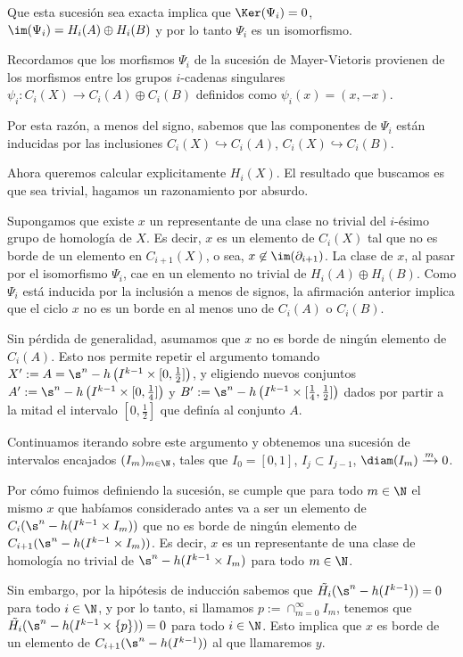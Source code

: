 \begin{dem}
    Que esta sucesión sea exacta implica que $\Ker(\Psi_i)=0$, $\im(\Psi_i) = H_i(A)\oplus H_i(B)$ y por lo tanto $\Psi_i$ es un isomorfismo.

    Recordamos que los morfismos $\Psi_i$ de la sucesión de Mayer-Vietoris provienen de los morfismos entre los grupos $i$-cadenas singulares $\psi_i :C_i(X)\rightarrow C_i(A)\oplus C_i(B)$ definidos como $\psi_i(x)=(x,-x)$. 
        
    Por esta razón, a menos del signo, sabemos que las componentes de $\Psi_i$ están inducidas por las inclusiones $C_i(X)\hookrightarrow C_i(A)$, $C_i(X)\hookrightarrow C_i(B)$.

    Ahora queremos calcular explicitamente $H_i(X)$. El resultado que buscamos es que sea trivial, hagamos un razonamiento por absurdo.

    Supongamos que existe $x$ un representante de una clase no trivial del $i$-ésimo grupo de homología de $X$. Es decir, $x$ es un elemento de $C_i(X)$ tal que no es borde de un elemento en $C_{i+1}(X)$, o sea, $x\not\in\im(\partial_{i+1})$. La clase de $x$, al pasar por el isomorfismo $\Psi_i$, cae en un elemento no trivial de $H_i(A)\oplus H_i(B)$. Como $\Psi_i$ está inducida por la inclusión a menos de signos, la afirmación anterior implica que el ciclo $x$ no es un borde en al menos uno de $C_i(A)$ o $C_i(B)$.

    Sin pérdida de generalidad, asumamos que $x$ no es borde de ningún elemento de $C_i(A)$. Esto nos permite repetir el argumento tomando $X':=A=\s^n - h\left(I^{k-1}\times[0,\frac{1}{2}]\right)$, y eligiendo nuevos conjuntos $A':=\s^n - h\left(I^{k-1}\times[0,\frac{1}{4}]\right)$ y $B':=\s^n - h\left(I^{k-1}\times[\frac{1}{4},\frac{1}{2}]\right)$ dados por partir a la mitad el intervalo $[0,\frac{1}{2}]$ que definía al conjunto $A$. 
    
    Continuamos iterando sobre este argumento y obtenemos una sucesión de intervalos encajados $(I_m)_{m\in\N}$, tales que $I_0=[0,1]$, $I_j\subset I_{j-1}$, $\diam(I_m)\xrightarrow{m}0$.

    Por cómo fuimos definiendo la sucesión, se cumple que para todo $m\in\N$ el mismo $x$ que habíamos considerado antes va a ser un elemento de $C_i(\s^n - h(I^{k-1}\times I_m))$ que no es borde de ningún elemento de $C_{i+1}(\s^n - h(I^{k-1}\times I_m))$. Es decir, $x$ es un representante de una clase de homología no trivial de $\s^n - h(I^{k-1}\times I_m)$ para todo $m\in\N$.

    Sin embargo, por la hipótesis de inducción sabemos que $\tilde{H_i}(\s^n - h(I^{k-1}))=0$ para todo $i\in\N$, y por lo tanto, si llamamos $p:=\cap_{m=0}^\infty I_m$, tenemos que $\tilde{H_i}(\s^n - h(I^{k-1}\times\{p\}))=0$ para todo $i\in\N$. Esto implica que $x$ es borde de un elemento de $C_{i+1}(\s^n - h(I^{k-1}))$ al que llamaremos $y$.


\end{dem}
